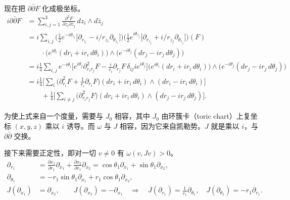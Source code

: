 现在把 $\partial\bar\partial F$ 化成极坐标。
\begin{align*}
i\partial\bar\partial F
&=\sum_{i,j=1}^{3}\frac{\partial^2F}{\partial z_i\partial\bar z_j}\,dz_i\wedge d\bar z_j\\
&=i\sum_{i,j}\Big(\tfrac12e^{-i\theta_{z_i}}\big[\partial_{r_{z_i}}-i/r_{z_i}\partial_{\theta_{z_i}}\big]\Big)
\Big(\tfrac12e^{i\theta_{z_j}}\big[\partial_{r_{z_j}}+i/r_{z_j}\partial_{\theta_{z_j}}\big]\Big)(F)\\
&\qquad\cdot\big(e^{i\theta_i}(dr_i+ir_i\,d\theta_i)\big)\wedge\big(e^{-i\theta_j}(dr_j-ir_j\,d\theta_j)\big)\\
&=i\tfrac14\sum_{i,j}e^{-i\theta_i}\Big[e^{i\theta_j}\partial^2_{r_ir_j}F
-\frac{i}{r_i}\partial_{r_j}F\,\delta_{ij}ie^{i\theta_j}\Big]
\big(e^{i\theta_i}(dr_i+ir_i\,d\theta_i)\big)\wedge\big(e^{-i\theta_j}(dr_j-ir_j\,d\theta_j)\big)\\
&=i\tfrac14\Big[\sum_i\Big(\partial^2_{r_i}F+\frac{1}{r_i}\partial_{r_i}F\Big)
(dr_i+ir_i\,d\theta_i)\wedge(dr_i-ir_i\,d\theta_i)\Big]\\
&\qquad+\tfrac14\Big[\sum_{i\ne j}\big(\partial^2_{r_ir_j}F\big)
(dr_i+ir_i\,d\theta_i)\wedge(dr_j-ir_j\,d\theta_j)\Big].
\end{align*}

为使上式来自一个度量，需要与 $J_0$ 相容，其中 $J_0$ 由环簇卡（toric chart）上复坐标 $(x,y,z)$ 乘以 $i$ 诱导。而 $\omega$ 与 $J$ 相容，因为它来自凯勒势。$J$ 就是乘以 $i$，与 $\partial\bar\partial$ 交换。


接下来需要正定性，即对一切 $v\ne0$ 有 $\omega(v,Jv)>0$。
\begin{align*}
\partial_{r_1}&=\frac{\partial x_1}{\partial r_1}\partial_{x_1}+\frac{\partial x_2}{\partial r_1}\partial_{x_2}
=\cos\theta_1\partial_{x_1}+\sin\theta_1\partial_{x_2},\\
\partial_{\theta_1}&=-r_1\sin\theta_1\partial_{x_1}+r_1\cos\theta_1\partial_{x_2},\\
J(\partial_{x_1})&=\partial_{x_2},\qquad J(\partial_{x_2})=-\partial_{x_1}
\quad\Longrightarrow\quad J(\partial_{r_1})=\frac{1}{r_1}\partial_{\theta_1},\quad
J(\partial_{\theta_1})=-r_1\partial_{r_1}.
\end{align*}

